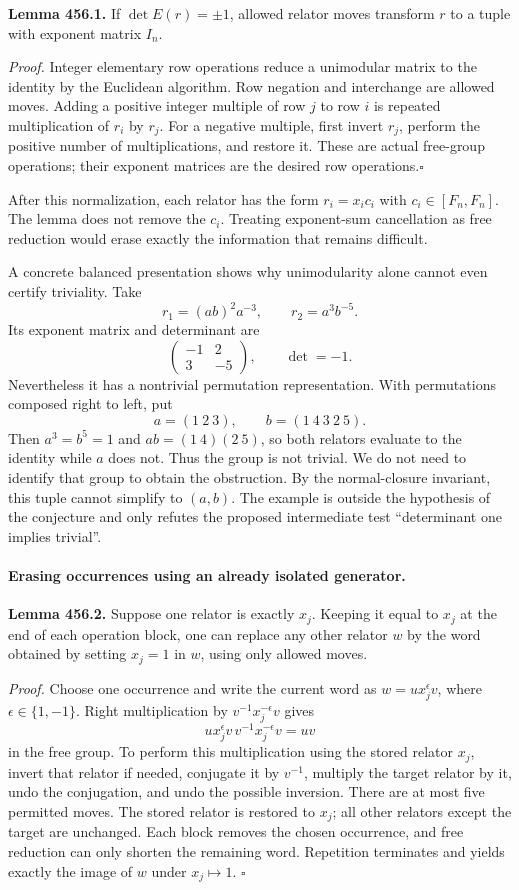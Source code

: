 \documentclass[11pt]{article}
\begin{document}
\textbf{Lemma 456.1.} If $\det E(r)=\pm1$, allowed relator moves
transform $r$ to a tuple with exponent matrix $I_n$.

\emph{Proof.}
Integer elementary row operations reduce a unimodular matrix to the
identity by the Euclidean algorithm. Row negation and interchange are
allowed moves. Adding a positive integer multiple of row $j$ to row
$i$ is repeated multiplication of $r_i$ by $r_j$. For a negative
multiple, first invert $r_j$, perform the positive number of
multiplications, and restore it. These are actual free-group operations;
their exponent matrices are the desired row operations.\hfill$\square$

After this normalization, each relator has the form
$r_i=x_ic_i$ with $c_i\in[F_n,F_n]$. The lemma does not remove the
$c_i$. Treating exponent-sum cancellation as free reduction would
erase exactly the information that remains difficult.

A concrete balanced presentation shows why unimodularity alone cannot
even certify triviality. Take
\[
 r_1=(ab)^2a^{-3},\qquad r_2=a^3b^{-5}.
\]
Its exponent matrix and determinant are
\[
 \begin{pmatrix}-1&2\\3&-5\end{pmatrix},\qquad \det=-1.
\]
Nevertheless it has a nontrivial permutation representation. With
permutations composed right to left, put
\[
 a=(1\ 2\ 3),\qquad b=(1\ 4\ 3\ 2\ 5).
\]
Then $a^3=b^5=1$ and $ab=(1\ 4)(2\ 5)$, so both relators evaluate
to the identity while $a$ does not. Thus the group is not trivial.
We do not need to identify that group to obtain the obstruction.
By the normal-closure invariant, this tuple cannot simplify to $(a,b)$.
The example is outside the hypothesis of the conjecture and only
refutes the proposed intermediate test ``determinant one implies trivial''.

\paragraph{Erasing occurrences using an already isolated generator.}
\textbf{Lemma 456.2.} Suppose one relator is exactly $x_j$. Keeping
it equal to $x_j$ at the end of each operation block, one can replace
any other relator $w$ by the word obtained by setting $x_j=1$ in $w$,
using only allowed moves.

\emph{Proof.}
Choose one occurrence and write the current word as
$w=u x_j^{\epsilon}v$, where $\epsilon\in\{1,-1\}$.
Right multiplication by $v^{-1}x_j^{-\epsilon}v$ gives
\[
 u x_j^\epsilon v\,v^{-1}x_j^{-\epsilon}v=uv
\]
in the free group. To perform this multiplication using the stored
relator $x_j$, invert that relator if needed, conjugate it by $v^{-1}$,
multiply the target relator by it, undo the conjugation, and undo
the possible inversion. There are at most five permitted moves.
The stored relator is restored to $x_j$; all other relators except
the target are unchanged. Each block removes the chosen occurrence,
and free reduction can only shorten the remaining word. Repetition
terminates and yields exactly the image of $w$ under $x_j\mapsto1$.
\hfill$\square$
\end{document}
